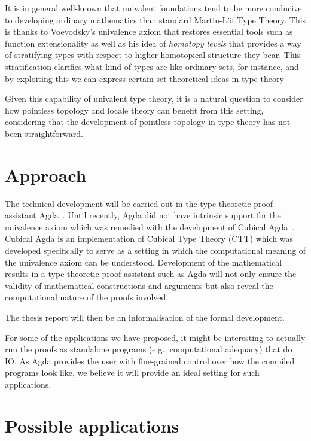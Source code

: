\documentclass{article}
\begin{document}
It is in general well-known that univalent foundations tend to be more conducive to
developing ordinary mathematics than standard Martin-L\"{o}f Type Theory. This is thanks
to Voevodsky's univalence axiom that restores essential tools such as function
extensionality as well as his idea of \emph{homotopy levels} that provides a way of
stratifying types with respect to higher homotopical structure they bear. This
stratification clarifies what kind of types are like ordinary sets, for instance, and by
exploiting this we can express certain set-theoretical ideas in type
theory~\cite[Chapter 10]{hottbook}

Given this capability of univalent type theory, it is a natural question to consider how
pointless topology and locale theory can benefit from this setting, considering that the
development of pointless topology in type theory has not been straightforward.

\section{Approach}\label{sec:approach}

The technical development will be carried out in the type-theoretic proof assistant
Agda~\cite{norell:2008}. Until recently, Agda did not have intrinsic support for the
univalence axiom which was remedied with the development of Cubical
Agda~\cite{cubicalagda}. Cubical Agda is an implementation of Cubical Type Theory (CTT)
which was developed specifically to serve as a setting in which the computational meaning
of the univalence axiom can be understood. Development of the mathematical results in a
type-theoretic proof assistant such as Agda will not only ensure the validity of
mathematical constructions and arguments but also reveal the computational nature of the
proofs involved.

The thesis report will then be an informalisation of the formal development.

For some of the applications we have proposed, it might be interesting to actually run the
proofs as standalone programs (e.g., computational adequacy) that do IO. As Agda provides
the user with fine-grained control over how the compiled programs look like, we believe it
will provide an ideal setting for such applications.

\section{Possible applications}\label{sec:applications}
\end{document}
